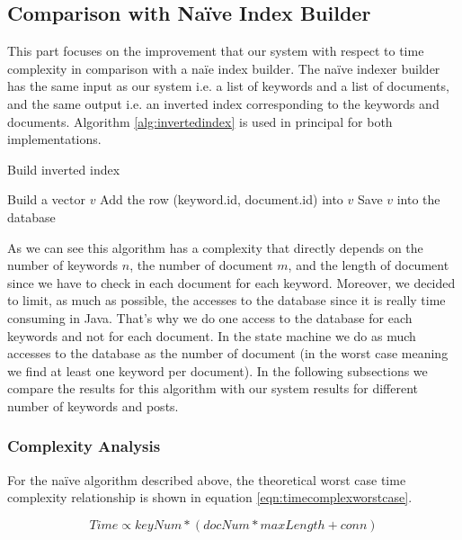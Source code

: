 \documentclass[10pt]{report}
\begin{document}
\subsection{Comparison with Na\"{i}ve Index Builder}
This part focuses on the improvement that our system with respect to
time complexity in comparison with a na\"{i}e index builder. The na\"{i}ve
indexer builder has the same input as our system i.e. a list of
keywords and a list of documents, and the same output i.e. an inverted
index corresponding to the keywords and documents. Algorithm
\ref{alg:invertedindex} is used in principal for both implementations.


\begin{algorithm}
\caption{Build inverted index}
\label{alg:invertedindex}
\begin{algorithmic}
  \STATE Build a vector $v$
  \STATE Add the row (keyword.id, document.id) into $v$
  \ENDFOR
  \STATE Save $v$ into the database
  \ENDFOR
\end{algorithmic}
\end{algorithm}

As we can see this algorithm has a complexity that directly depends on
the number of keywords $n$, the number of document $m$, and the length
of document since we have to check in each document for each
keyword. Moreover, we decided to limit, as much as possible, the
accesses to the database since it is really time consuming in
Java. That’s why we do one access to the database for each keywords
and not for each document. In the state machine we do as much accesses
to the database as the number of document (in the worst case meaning
we find at least one keyword per document). In the following
subsections we compare the results for this algorithm with our system
results for different number of keywords and posts.


\subsubsection{Complexity Analysis}
For the na\"{i}ve algorithm described above, the theoretical worst
case time complexity relationship is shown in equation
\ref{eqn:timecomplexworstcase}.  

\begin{equation}
\label{eqn:timecomplexworstcase}
Time \propto keyNum * ( docNum * maxLength + conn)
\end{equation}
\end{document}
